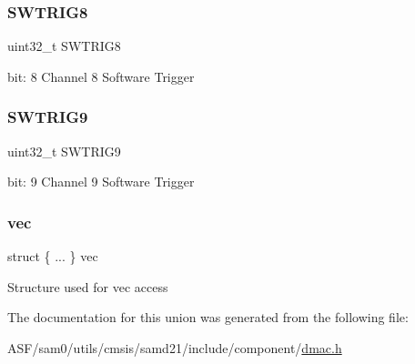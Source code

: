 \subsubsection{\texorpdfstring{SWTRIG8}{SWTRIG8}}
{\footnotesize\ttfamily uint32\+\_\+t S\+W\+T\+R\+I\+G8}

bit\+: 8 Channel 8 Software Trigger \mbox{\label{union_d_m_a_c___s_w_t_r_i_g_c_t_r_l___type_ad419de281974df50ab7a7603c559ac6c}} 
\subsubsection{\texorpdfstring{SWTRIG9}{SWTRIG9}}
{\footnotesize\ttfamily uint32\+\_\+t S\+W\+T\+R\+I\+G9}

bit\+: 9 Channel 9 Software Trigger \mbox{\label{union_d_m_a_c___s_w_t_r_i_g_c_t_r_l___type_a176d4a9dee328a9fcc5bb981cb53de76}} 
\subsubsection{\texorpdfstring{vec}{vec}}
{\footnotesize\ttfamily struct \{ ... \}   vec}

Structure used for vec access 

The documentation for this union was generated from the following file\+:\begin{DoxyCompactItemize}
\item 
A\+S\+F/sam0/utils/cmsis/samd21/include/component/\mbox{\hyperlink{component_2dmac_8h}{dmac.\+h}}\end{DoxyCompactItemize}
